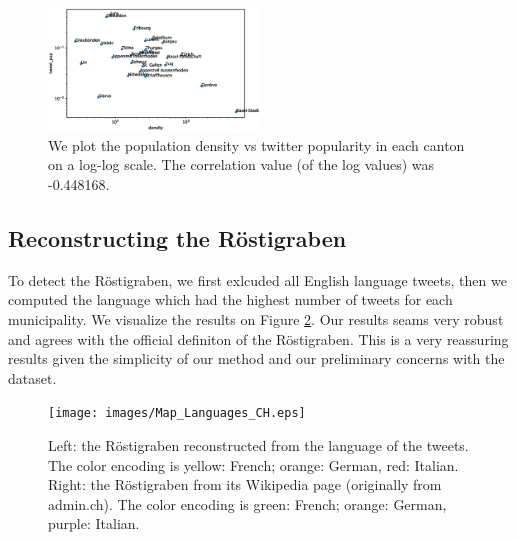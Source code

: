 \begin{figure}[h]
  \includegraphics[width=0.5\textwidth]{images/can_density_pop.eps}
  \caption{We plot the population density vs twitter popularity in each canton on a log-log scale. The correlation value (of the log values) was -0.448168.}
  \label{can_pop}
\end{figure}


\subsection{Reconstructing the R\"ostigraben}
To detect the R\"ostigraben, we first exlcuded all English language tweets, then we computed the language which had the highest number of tweets for each municipality. We visualize the results on Figure \ref{rosti_map}. Our results seams very robust and agrees with the official definiton of the R\"ostigraben. This is a very reassuring results given the simplicity of our method and our preliminary concerns with the dataset.

\begin{figure}[h]
  \texttt{[image: images/Map\_Languages\_CH.eps]}
  \caption{Left: the R\"ostigraben reconstructed from the language of the tweets. The color encoding is yellow: French; orange: German, red: Italian. Right: the R\"ostigraben from its Wikipedia page (originally from admin.ch). The color encoding is green: French; orange: German, purple: Italian.}
  \label{rosti_map}
\end{figure}

 
